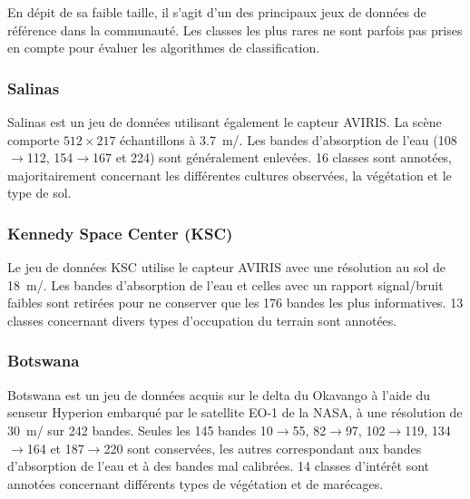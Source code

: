 En dépit de sa faible taille, il s'agit d'un des principaux jeux de données de référence dans la communauté. Les classes les plus rares ne sont parfois pas prises en compte pour évaluer les algorithmes de classification.

\subsubsection{Salinas}
Salinas est un jeu de données utilisant également le capteur \gls{AVIRIS}. La scène comporte $512\times217$ échantillons à \SI{3,7}{\meter/\px}. Les bandes d'absorption de l'eau (108$\rightarrow$112, 154$\rightarrow$167 et 224) sont généralement enlevées. 16 classes sont annotées, majoritairement concernant les différentes cultures observées, la végétation et le type de sol.

\subsubsection{Kennedy Space Center (KSC)}
Le jeu de données KSC utilise le capteur \gls{AVIRIS} avec une résolution au sol de \SI{18}{\meter/\px}. Les bandes d'absorption de l'eau et celles avec un rapport signal/bruit faibles sont retirées pour ne conserver que les 176 bandes les plus informatives. 13 classes concernant divers types d'occupation du terrain sont annotées.

\subsubsection{Botswana}
Botswana est un jeu de données acquis sur le delta du Okavango à l'aide du senseur Hyperion embarqué par le satellite EO-1 de la NASA, à une résolution de \SI{30}{\meter/\px} sur 242 bandes. Seules les 145 bandes 10$\rightarrow$55, 82$\rightarrow$97, 102$\rightarrow$119, 134$\rightarrow$164 et 187$\rightarrow$220 sont conservées, les autres correspondant aux bandes d'absorption de l'eau et à des bandes mal calibrées. 14 classes d'intérêt sont annotées concernant différents types de végétation et de marécages.


